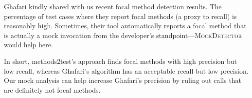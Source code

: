 Ghafari kindly shared with us recent focal method detection results. The percentage of test cases where they report focal methods (a proxy to recall) is reasonably high. Sometimes, their tool automatically reports a focal method that is actually a mock invocation from the developer's standpoint---\textsc{MockDetector} would help here. 

In short, methods2test's approach finds focal methods with high precision but low recall, whereas Ghafari's algorithm has an acceptable recall but low precision. Our mock analysis can help increase Ghafari's precision by ruling out calls that are definitely not focal methods.

